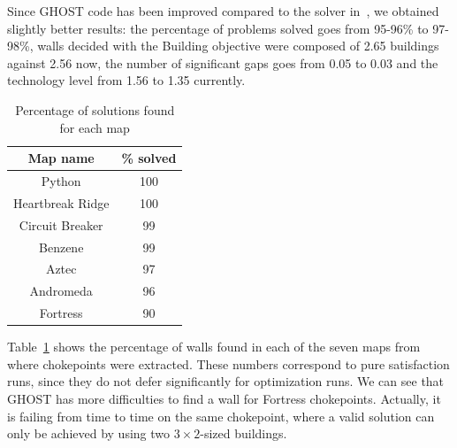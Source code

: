 \documentclass[journal]{IEEEtran}
\newcommand{\ghost}{\textsc{GHOST}\xspace}
\begin{document}
Since  \ghost   code  has  been   improved  compared  to   the  solver
in~\cite{RichouxUO14},  we  obtained   slightly  better  results:  the
percentage  of problems  solved goes  from 95-96\%  to 97-98\%,  walls
decided with  the Building objective  were composed of  2.65 buildings
against 2.56  now, the number  of significant  gaps goes from  0.05 to
0.03 and the technology level from 1.56 to 1.35 currently.
\begin{table}[ht]
  \caption{Percentage of solutions found for each map} 
    \label{tab:map}
    \centering
    \begin{tabular}{|c|c|}
      \hline
      Map name & \% solved\\
      \hline
      Python & 100\\
      Heartbreak Ridge & 100\\
      Circuit Breaker & 99\\
      Benzene & 99\\
      Aztec & 97\\
      Andromeda & 96\\
      Fortress & 90\\
      \hline
    \end{tabular}  
\end{table}
Table~\ref{tab:map} shows the percentage of walls found in each of the
seven  maps  from where  chokepoints  were  extracted.  These  numbers
correspond  to  pure  satisfaction  runs,  since  they  do  not  defer
significantly for optimization  runs. We can see that  \ghost has more
difficulties to find a wall  for Fortress chokepoints. Actually, it is
failing  from time  to  time on  the same  chokepoint,  where a  valid
solution  can  only  be  achieved  by using  two  $3  \times  2$-sized
buildings.
\end{document}
